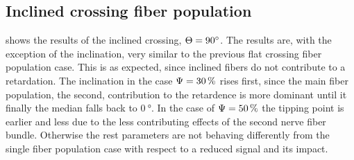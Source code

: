 \subsection{Inclined crossing fiber population}
 shows the results of the inclined crossing, \ie{} $\textnormal{$\Theta$}=\SI{90}{\degree}$.
The results are, with the exception of the inclination, very similar to the previous flat crossing fiber population case.
This is as expected, since inclined fibers do not contribute to a retardation.
The inclination in the case $\textnormal{$\Psi$}=\SI{30}{\percent}$ rises first, since the main fiber population, \ie{} the second, contribution to the retardence is more dominant until it finally the median falls back to $\SI{0}{\degree}$.
In the case of $\textnormal{$\Psi$}=\SI{50}{\percent}$ the tipping point is earlier and less due to the less contributing effects of the second nerve fiber bundle.
Otherwise the rest parameters are not behaving differently from the single fiber population case with respect to a reduced signal and its impact.
% 
